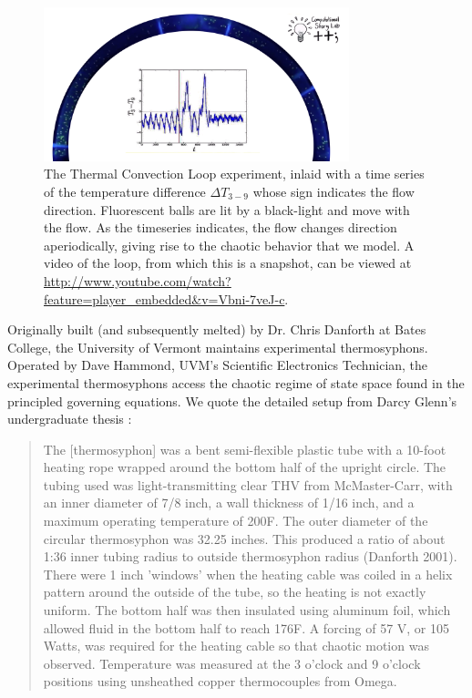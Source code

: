 \documentclass[12pt]{report}
\begin{document}
\begin{figure}[h!]
  \centering
  \includegraphics[width=0.79\textwidth]{figures/convectionLoopYoutubeScreenShot3.png}
  \caption[The Thermal Convection Loop experiment]
  {
    The Thermal Convection Loop experiment, inlaid with a time series of the temperature difference $\Delta T_{3-9}$ whose sign indicates the flow direction.
    Fluorescent balls are lit by a black-light and move with the flow.
    As the timeseries indicates, the flow changes direction aperiodically, giving rise to the chaotic behavior that we model.
    A video of the loop, from which this is a snapshot, can be viewed at \url{http://www.youtube.com/watch?feature=player_embedded&v=Vbni-7veJ-c}.
          }
  \label{fig:chrisLoop}
\end{figure}

Originally built (and subsequently melted) by Dr. Chris Danforth at Bates College, the University of Vermont maintains experimental thermosyphons.
Operated by Dave Hammond, UVM's Scientific Electronics Technician, the experimental thermosyphons access the chaotic regime of state space found in the principled governing equations.
We quote the detailed setup from Darcy Glenn's undergraduate thesis :
\begin{quote}
The [thermosyphon] was a bent semi-flexible plastic tube with a 10-foot heating rope wrapped around the bottom half of the upright circle.
The tubing used was light-transmitting clear THV from McMaster-Carr, with an inner diameter of 7/8 inch, a wall thickness of 1/16 inch, and a maximum operating temperature of 200F.
The outer diameter of the circular thermosyphon was 32.25 inches.
This produced a ratio of about 1:36 inner tubing radius to outside thermosyphon radius (Danforth 2001).
There were 1 inch 'windows' when the heating cable was coiled in a helix pattern around the outside of the tube, so the heating is not exactly uniform.
The bottom half was then insulated using aluminum foil, which allowed fluid in the bottom half to reach 176F.
A forcing of 57 V, or 105 Watts, was required for the heating cable so that chaotic motion was observed.
Temperature was measured at the 3 o'clock and 9 o'clock positions using unsheathed copper thermocouples from Omega.
\end{quote}
\end{document}

